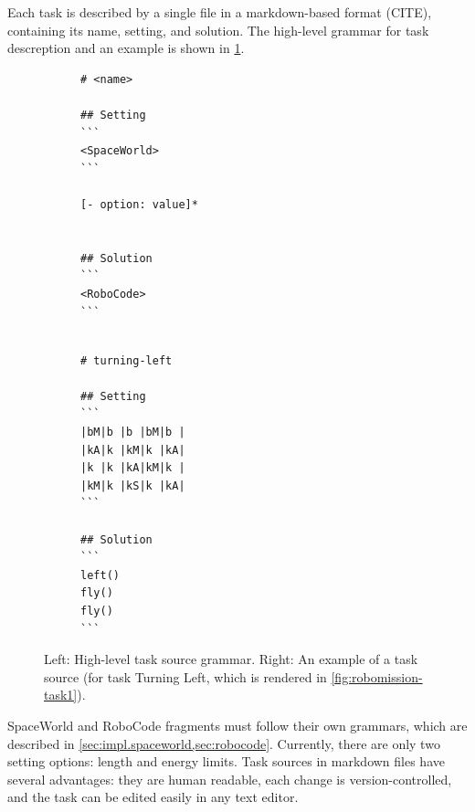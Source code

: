 Each task is described by a single file in a markdown-based format (CITE),
containing its name, setting, and solution.
The high-level grammar for task descreption and an example is shown in
\cref{fig:task-source}.

\begin{figure}[htb]
\centering
\begin{subfigure}{.49\textwidth}
{\lstset{numbers=none, showlines=true}
\begin{lstlisting}[basicstyle=\small\ttfamily]
# <name>

## Setting
```
<SpaceWorld>
```

[- option: value]*


## Solution
```
<RoboCode>
```


\end{lstlisting}}
\end{subfigure}
\begin{subfigure}{.49\textwidth}
{\lstset{numbers=none}
\begin{lstlisting}[basicstyle=\small\ttfamily]
# turning-left

## Setting
```
|bM|b |b |bM|b |
|kA|k |kM|k |kA|
|k |k |kA|kM|k |
|kM|k |kS|k |kA|
```

## Solution
```
left()
fly()
fly()
```
\end{lstlisting}}
\end{subfigure}
\caption{%
  Left: High-level task source grammar.
  Right: An example of a task source
  (for task Turning Left, which is rendered in \cref{fig:robomission-task1}).}
\label{fig:task-source}
\end{figure}

SpaceWorld and RoboCode fragments must follow their own grammars, which
are described in \cref{sec:impl.spaceworld,sec:robocode}.
Currently, there are only two setting options: length and energy limits.
Task sources in markdown files have several advantages:
they are human readable,  %
each change is version-controlled,
and the task can be edited easily in any text editor.

